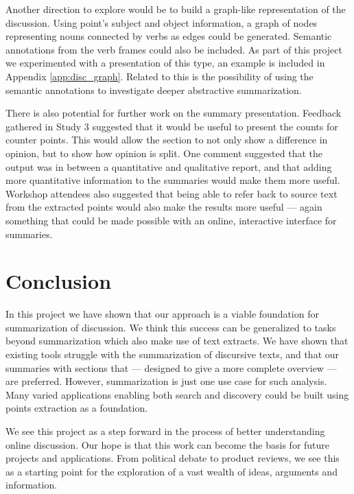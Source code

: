     Another direction to explore would be to build a graph-like representation of the discussion. Using point's subject and object information, a graph of nodes representing nouns connected by verbs as edges could be generated. Semantic annotations from the verb frames could also be included. As part of this project we experimented with a presentation of this type, an example is included in Appendix \ref{app:disc_graph}. Related to this is the possibility of using the semantic annotations to investigate deeper abstractive summarization.

    There is also potential for further work on the summary presentation. Feedback gathered in Study 3 suggested that it would be useful to present the counts for counter points. This would allow the section to not only show a difference in opinion, but to show how opinion is split. One comment suggested that the output was in between a quantitative and qualitative report, and that adding more quantitative information to the summaries would make them more useful. Workshop attendees also suggested that being able to refer back to source text from the extracted points would also make the results more useful --- again something that could be made possible with an online, interactive interface for summaries.

  \section{Conclusion}
    In this project we have shown that our approach is a viable foundation for summarization of discussion. We think this success can be generalized to tasks beyond summarization which also make use of text extracts. We have shown that existing tools struggle with the summarization of discursive texts, and that our summaries with sections that --- designed to give a more complete overview --- are preferred. However, summarization is just one use case for such analysis. Many varied applications enabling both search and discovery could be built using points extraction as a foundation.

    We see this project as a step forward in the process of better understanding online discussion. Our hope is that this work can become the basis for future projects and applications. From political debate to product reviews, we see this as a starting point for the exploration of a vast wealth of ideas, arguments and information.
